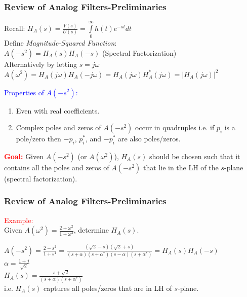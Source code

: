 \documentclass[mathserif, 10pt]{beamer} %
\begin{document}
\frame
{
\normalsize
\frametitle{Review of Analog Filters-Preliminaries}
Recall:  $H_A(s) = \frac{Y(s)}{U(s)} = \int\limits_{0}^\infty h(t) e^{-st}dt$ \\ \vspace{.1in}
Define \textit{Magnitude-Squared Function}:\\ \vspace{.05in}
	 $A(-s^2) = H_A(s)H_A(-s)$ (Spectral Factorization)\\ \vspace{.05in}
Alternatively by letting $s=j\omega$ \\ \vspace{.05in}
$A(\omega^2) = H_A(j\omega)H_A(-j\omega) = H_A(j\omega)H^*_A(j\omega)=  |H_A(j\omega)|^2$\\ \vspace{.2in}

\textcolor{blue}{Properties of $A(-s^2)$:}\\

\begin{enumerate}
\item Even with real coefficients.
\item Complex poles and zeros of $A(-s^2)$ occur in quadruples i.e. if $p_i$ is a pole/zero then $-p_i$, $p^*_i$, and $-p^*_i$ are also poles/zeros. 
\end{enumerate}

\textcolor{red}{\textbf{Goal:}} Given $A(-s^2)$ (or $A(\omega^2)$), $H_A(s)$ should be chosen such that it contains all the poles and zeros of $A(-s^2)$ that lie in
the LH of the $s$-plane (spectral factorization). 


}

\frame
{
\normalsize
\frametitle{Review of Analog Filters-Preliminaries}
\textcolor{red}{Example:}\\
Given $A(\omega^2) = \frac{2+\omega^2}{1+\omega^4}$, determine $H_A(s)$. \\ \vspace{0.1in}

$A(-s^2) = \frac{2-s^2}{1+s^4} = \frac{(\sqrt{2}-s)(\sqrt{2}+s)}{(s+\alpha)(s+\alpha^*)(s-\alpha)(s+\alpha^*)} = H_A(s)H_A(-s)$\\
$\alpha = \frac{1+j}{\sqrt{2}}$\\
$H_A(s) = \frac{s+\sqrt{2}}{(s+\alpha)(s+\alpha^*)}$\\ \vspace{.1in}
i.e. $H_A(s)$ captures all poles/zeros that are in LH of $s$-plane.

}
\end{document}
